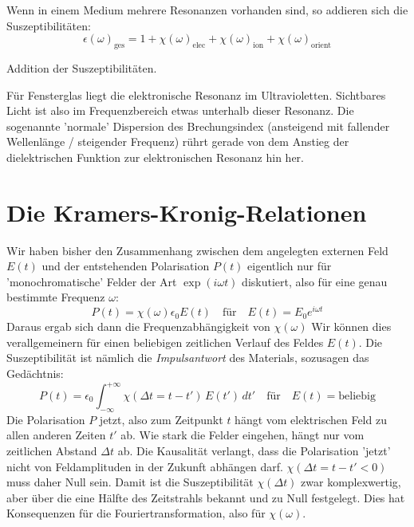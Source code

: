 Wenn in einem Medium mehrere Resonanzen vorhanden sind, so addieren sich die Suszeptibilitäten:
\begin{equation}
\epsilon(\omega)_\text{ges} = 1 + \chi(\omega)_\text{elec} +  \chi(\omega)_\text{ion}  + \chi(\omega)_\text{orient}
\end{equation}

\begin{marginfigure}

\caption{Addition der Suszeptibilitäten. \label{fig:diel_multiple_lorentz}}
\end{marginfigure}

Für Fensterglas liegt die elektronische Resonanz im Ultravioletten. Sichtbares Licht ist also im Frequenzbereich etwas unterhalb dieser Resonanz. Die sogenannte 'normale' Dispersion des Brechungsindex (ansteigend mit fallender Wellenlänge / steigender Frequenz) rührt gerade von dem Anstieg der dielektrischen Funktion zur elektronischen Resonanz hin her.


\section{Die Kramers-Kronig-Relationen}

Wir haben bisher den Zusammenhang zwischen dem angelegten externen Feld $E(t)$ und der entstehenden Polarisation $P(t)$ eigentlich nur für 'monochromatische' Felder der Art $\exp(i \omega t)$ diskutiert, also für eine genau bestimmte Frequenz $\omega$:
\begin{equation}
P(t) = \chi(\omega) \epsilon_0 E(t) \quad \text{für} \quad E(t) = E_0 e^{i \omega t}
\end{equation}
Daraus ergab sich dann die Frequenzabhängigkeit von $\chi(\omega)$ Wir können dies verallgemeinern für einen beliebigen zeitlichen Verlauf des Feldes  $E(t)$. Die Suszeptibilität ist nämlich die  \emph{Impulsantwort} des Materials, sozusagen das Gedächtnis:
\begin{equation}
P(t) = \epsilon_0 \int_{-\infty}^{+\infty} \chi( \Delta t = t - t') \, E(t') \, dt' \quad \text{für} \quad E(t) = \text{beliebig}
\end{equation}
Die Polarisation $P$ jetzt, also zum Zeitpunkt $t$ hängt vom elektrischen Feld zu allen anderen Zeiten $t'$ ab. Wie stark die Felder eingehen, hängt nur vom zeitlichen Abstand $\Delta t$ ab. Die Kausalität verlangt, dass die Polarisation 'jetzt' nicht von Feldamplituden in der Zukunft abhängen darf. $\chi( \Delta t = t - t' < 0) $ muss daher Null sein. Damit ist die Suszeptibilität $\chi( \Delta t ) $ zwar komplexwertig, aber über die eine Hälfte des Zeitstrahls bekannt und zu Null festgelegt. Dies hat Konsequenzen für die Fouriertransformation, also für $\chi(\omega)$.

